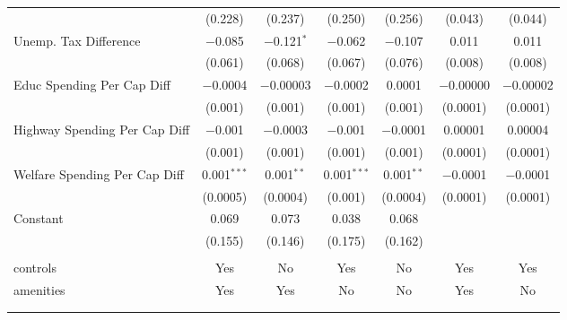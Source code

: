 \begin{table}[!htbp]
\begin{tabular}{@{\extracolsep{5pt}}lcccccc}
  & (0.228) & (0.237) & (0.250) & (0.256) & (0.043) & (0.044) \\ 
  Unemp. Tax Difference & $-$0.085 & $-$0.121$^{*}$ & $-$0.062 & $-$0.107 & 0.011 & 0.011 \\ 
  & (0.061) & (0.068) & (0.067) & (0.076) & (0.008) & (0.008) \\ 
  Educ Spending Per Cap Diff & $-$0.0004 & $-$0.00003 & $-$0.0002 & 0.0001 & $-$0.00000 & $-$0.00002 \\ 
  & (0.001) & (0.001) & (0.001) & (0.001) & (0.0001) & (0.0001) \\ 
  Highway Spending Per Cap Diff & $-$0.001 & $-$0.0003 & $-$0.001 & $-$0.0001 & 0.00001 & 0.00004 \\ 
  & (0.001) & (0.001) & (0.001) & (0.001) & (0.0001) & (0.0001) \\ 
  Welfare Spending Per Cap Diff & 0.001$^{***}$ & 0.001$^{**}$ & 0.001$^{***}$ & 0.001$^{**}$ & $-$0.0001 & $-$0.0001 \\ 
  & (0.0005) & (0.0004) & (0.001) & (0.0004) & (0.0001) & (0.0001) \\ 
  Constant & 0.069 & 0.073 & 0.038 & 0.068 &  &  \\ 
  & (0.155) & (0.146) & (0.175) & (0.162) &  &  \\ 
 \hline \\[-1.8ex] 
controls & Yes & No & Yes & No & Yes & Yes \\ 
amenities & Yes & Yes & No & No & Yes & No \\ 
\hline \\[-1.8ex] 
\hline 
\hline \\[-1.8ex] 
\end{tabular} 
\end{table} 
